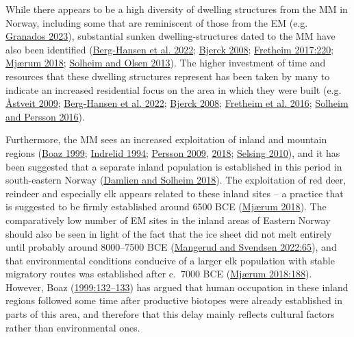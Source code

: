 \documentclass[
  12pt,
  a4paper,
  oneside]{book}
\begin{document}
While there appears to be a high diversity of dwelling structures from the MM in Norway, including some that are reminiscent of those from the EM (e.g. \protect\hyperlink{ref-granados2023}{Granados 2023}), substantial sunken dwelling-structures dated to the MM have also been identified (\protect\hyperlink{ref-berg-hansen2022}{Berg-Hansen et al. 2022}; \protect\hyperlink{ref-bjerck2008}{Bjerck 2008}; \protect\hyperlink{ref-fretheim2017}{Fretheim 2017:220}; \protect\hyperlink{ref-mjuxe6rum2018}{Mjærum 2018}; \protect\hyperlink{ref-solheim2013}{Solheim and Olsen 2013}). The higher investment of time and resources that these dwelling structures represent has been taken by many to indicate an increased residential focus on the area in which they were built (e.g. \protect\hyperlink{ref-uxe5stveit2009}{Åstveit 2009}; \protect\hyperlink{ref-berg-hansen2022}{Berg-Hansen et al. 2022}; \protect\hyperlink{ref-bjerck2008}{Bjerck 2008}; \protect\hyperlink{ref-fretheim2016}{Fretheim et al. 2016}; \protect\hyperlink{ref-solheim2016}{Solheim and Persson 2016}).

Furthermore, the MM sees an increased exploitation of inland and mountain regions (\protect\hyperlink{ref-boaz1999}{Boaz 1999}; \protect\hyperlink{ref-indrelid1994}{Indrelid 1994}; \protect\hyperlink{ref-persson2009}{Persson 2009}, \protect\hyperlink{ref-persson2018}{2018}; \protect\hyperlink{ref-selsing2010}{Selsing 2010}), and it has been suggested that a separate inland population is established in this period in south-eastern Norway (\protect\hyperlink{ref-damlien2018}{Damlien and Solheim 2018}). The exploitation of red deer, reindeer and especially elk appears related to these inland sites -- a practice that is suggested to be firmly established around 6500 BCE (\protect\hyperlink{ref-mjuxe6rum2018}{Mjærum 2018}). The comparatively low number of EM sites in the inland areas of Eastern Norway should also be seen in light of the fact that the ice sheet did not melt entirely until probably around 8000--7500 BCE (\protect\hyperlink{ref-mangerud2022}{Mangerud and Svendsen 2022:65}), and that environmental conditions conducive of a larger elk population with stable migratory routes was established after c.~7000 BCE (\protect\hyperlink{ref-mjuxe6rum2018}{Mjærum 2018:188}). However, Boaz (\protect\hyperlink{ref-boaz1999}{1999:132--133}) has argued that human occupation in these inland regions followed some time after productive biotopes were already established in parts of this area, and therefore that this delay mainly reflects cultural factors rather than environmental ones.
\end{document}
